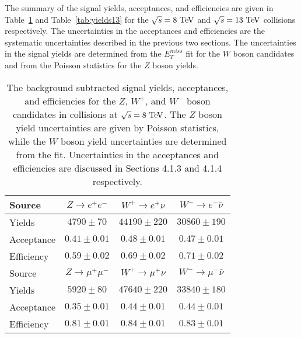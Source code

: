 The summary of the signal yields, acceptances, and efficiencies are given in Table~\ref{tab:yields8} and Table~\ref{tab:yields13} for the $\sqrt{s}=8~\mathrm{Te\kern -0.1em V}$ and $\sqrt{s}=13~\mathrm{Te\kern -0.1em V}$ collisions respectively. The uncertainties in the acceptances and efficiencies are the systematic uncertainties described in the previous two sections. The uncertainties in the signal yields are determined from the $E_{T}^{miss}$ fit for the $W$ boson candidates and  from the Poisson statistics for the $Z$ boson yields.   
\def\WEMYIELD{98200 \pm 950}
\def\WEPYIELD{122320 \pm 980}
\def\WMMYIELD{131250 \pm 910}
\def\WMPYIELD{167710 \pm 830}
\def\ZEEYIELD{15290 \pm 120}
\def\ZMMYIELD{23670 \pm 150}
\def\WMPACC{0.44 \pm 0.01 }
\def\WMMACC{0.46 \pm 0.01 }
\def\WMACC{0.45 \pm 0.01 }
\def\ZMMACC{0.36 \pm 0.01 }
\def\WMPEFF{0.78 \pm 0.01 }
\def\WMMEFF{0.79 \pm 0.01 }
\def\WMEFF{0.78 \pm 0.01 }
\def\ZMMEFF{0.80 \pm 0.02 }
\def\WEPACC{0.43 \pm 0.01 }
\def\WEMACC{0.44 \pm 0.01 }
\def\WEACC{0.44 \pm 0.01 }
\def\ZEEACC{0.33 \pm 0.01 }
\def\WEPEFF{0.58 \pm 0.01 }
\def\WEMEFF{0.60 \pm 0.01 }
\def\WEEFF{0.59 \pm 0.01 }
\def\ZEEEFF{0.56 \pm 0.01 }
\begin{table*}[thbp]
\centering
\begin {tabular} {lccc}
\hline
Source     &  $Z\rightarrow e^+e^-$  & $W^{+}\rightarrow e^+\nu$           & $W^{-}\rightarrow e^-\bar{\nu}$            \\
\hline
Yields     & $4790\pm70$ & $44190\pm220$ & $30860\pm190$\\
Acceptance&$0.41\pm0.01$&$0.48\pm0.01$&$0.47\pm0.01$\\
Efficiency&$0.59\pm0.02$&$0.69\pm0.02$&$0.71\pm0.02$\\
  \hline
 Source     &  $Z\rightarrow \mu^+\mu^-$  & $W^{+}\rightarrow \mu^+\nu$           & $W^{-}\rightarrow \mu^-\bar{\nu}$            \\
\hline
Yields    &  $5920\pm80$&$47640\pm220$&$33840\pm180$\\
Acceptance &$0.35\pm0.01$&$0.44\pm0.01$&$0.44\pm0.01$\\
Efficiency &$0.81\pm0.01$&$0.84\pm0.01$&$0.83\pm0.01$\\
\hline
\end{tabular}
\caption{ \label{tab:yields8}
The background subtracted signal yields, acceptances, and efficiencies for the $Z$, $W^+$, and $W^-$ boson candidates in collisions at $\sqrt{s}=8~\mathrm{Te\kern -0.1em V}$. The $Z$ boson yield uncertainties are given by Poisson statistics, while the $W$ boson yield uncertainties are determined from the fit. Uncertainties in the acceptances and efficiencies are discussed in Sections 4.1.3 and 4.1.4 respectively.}
\end{table*}
